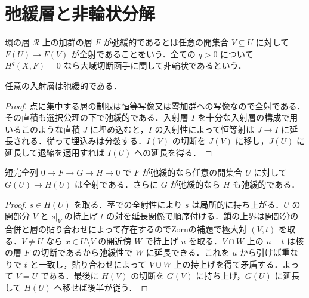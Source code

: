 \section{弛緩層と非輪状分解}
\begin{defn}[弛緩層と非輪状層]
環の層 $\mathcal R$ 上の加群の層 $F$ が弛緩的であるとは任意の開集合 $V\subseteq U$ に対して $F(U)\to F(V)$ が全射であることをいう．全ての $q>0$ について $H^q(X,F)=0$ なら大域切断函手に関して非輪状であるという．
\end{defn}
\begin{prop}[入射層の弛緩性]
任意の入射層は弛緩的である．
\end{prop}
\begin{proof}
点に集中する層の制限は恒等写像又は零加群への写像なので全射である．その直積も選択公理の下で弛緩的である．入射層 $I$ を十分な入射層の構成で用いるこのような直積 $J$ に埋め込むと，$I$ の入射性によって恒等射は $J\to I$ に延長される．従って埋込みは分裂する．$I(V)$ の切断を $J(V)$ に移し，$J(U)$ に延長して退縮を適用すれば $I(U)$ への延長を得る．
\end{proof}
\begin{prop}[弛緩層を核とする短完全列]
短完全列 $0\to F\to G\to H\to0$ で $F$ が弛緩的なら任意の開集合 $U$ に対して $G(U)\to H(U)$ は全射である．さらに $G$ が弛緩的なら $H$ も弛緩的である．
\end{prop}
\begin{proof}
$s\in H(U)$ を取る．茎での全射性により $s$ は局所的に持ち上がる．$U$ の開部分 $V$ と $s|_V$ の持上げ $t$ の対を延長関係で順序付ける．鎖の上界は開部分の合併と層の貼り合わせによって存在するのでZornの補題で極大対 $(V,t)$ を取る．$V\ne U$ なら $x\in U\setminus V$ の開近傍 $W$ で持上げ $u$ を取る．$V\cap W$ 上の $u-t$ は核の層 $F$ の切断であるから弛緩性で $W$ に延長できる．これを $u$ から引けば重なりで $t$ と一致し，貼り合わせによって $V\cup W$ 上の持上げを得て矛盾する．よって $V=U$ である．最後に $H(V)$ の切断を $G(V)$ に持ち上げ，$G(U)$ に延長して $H(U)$ へ移せば後半が従う．
\end{proof}
